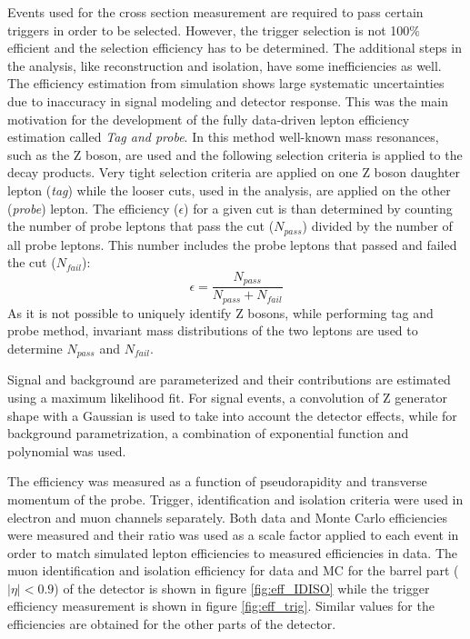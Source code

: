Events used for the cross section measurement are required to pass certain triggers in order to be selected. However, the trigger selection is not 100$\%$ efficient and the selection efficiency has to be determined. The additional steps in the analysis, like reconstruction and isolation, have some inefficiencies as well. The efficiency estimation from simulation shows large systematic uncertainties due to inaccuracy in signal modeling and detector response. This was the main motivation for the development of the fully data-driven lepton efficiency estimation called \textit{Tag and probe}. In this method well-known mass resonances, such as the Z boson, are used and the following selection criteria is applied to the decay products. 
Very tight selection criteria are applied on one Z boson daughter lepton (\textit{tag}) while the looser cuts, used in the analysis, are applied on the other (\textit{probe}) lepton. The efficiency ($\epsilon$) for a given cut is than determined by counting the number of probe leptons that pass the cut ($N_{pass}$) divided by the number of  all probe leptons. This number includes the probe leptons that passed and failed the cut ($N_{fail}$):    
\begin{equation}
\epsilon = \frac{N_{pass}}{N_{pass}+N_{fail}}
\end{equation} 
As it is not possible to uniquely identify Z bosons, while performing tag and probe method, invariant mass distributions of the two leptons are used to determine $N_{pass}$ and $N_{fail}$. 
  
Signal and background are parameterized and their contributions are estimated using a maximum likelihood fit. For signal events, a convolution of Z generator shape with a Gaussian is used to take into account the detector effects, while for background parametrization, a combination of exponential function and polynomial was used.
\par The efficiency was measured as a function of pseudorapidity and transverse momentum of the probe. Trigger, identification and isolation criteria were used in electron and muon channels separately. Both data and Monte Carlo efficiencies were measured and their ratio was used as a scale factor applied to each event in order to match simulated lepton efficiencies to measured efficiencies in data. The muon identification and isolation efficiency for data and MC for the barrel part ($|\eta|<0.9$) of the detector is shown in figure \ref{fig:eff_IDISO} while the trigger efficiency measurement is shown in figure \ref{fig:eff_trig}. Similar values for the efficiencies are obtained for the other parts of the detector.

